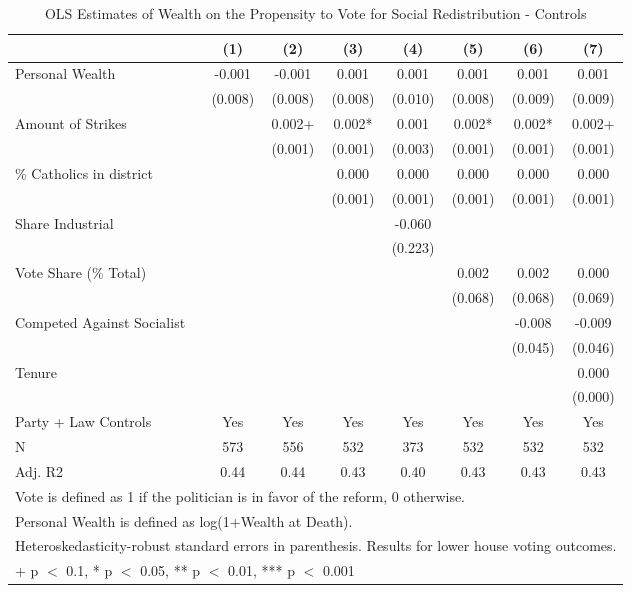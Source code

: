 \begin{table}

\caption{\label{tab:socialred_ols}OLS Estimates of Wealth on the Propensity to Vote for Social Redistribution - Controls}
\centering
\begin{tabular}[t]{lccccccc}
\toprule
  & (1) & (2) & (3) & (4) & (5) & (6) & (7)\\
\midrule
Personal Wealth & -0.001 & -0.001 & 0.001 & 0.001 & 0.001 & 0.001 & 0.001\\
 & (0.008) & (0.008) & (0.008) & (0.010) & (0.008) & (0.009) & (0.009)\\
Amount of Strikes &  & 0.002+ & 0.002* & 0.001 & 0.002* & 0.002* & 0.002+\\
 &  & (0.001) & (0.001) & (0.003) & (0.001) & (0.001) & (0.001)\\
\% Catholics in district &  &  & 0.000 & 0.000 & 0.000 & 0.000 & 0.000\\
 &  &  & (0.001) & (0.001) & (0.001) & (0.001) & (0.001)\\
Share Industrial &  &  &  & -0.060 &  &  & \\
 &  &  &  & (0.223) &  &  & \\
Vote Share (\% Total) &  &  &  &  & 0.002 & 0.002 & 0.000\\
 &  &  &  &  & (0.068) & (0.068) & (0.069)\\
Competed Against Socialist &  &  &  &  &  & -0.008 & -0.009\\
 &  &  &  &  &  & (0.045) & (0.046)\\
Tenure &  &  &  &  &  &  & 0.000\\
 &  &  &  &  &  &  & (0.000)\\
\midrule
Party + Law Controls & Yes & Yes & Yes & Yes & Yes & Yes & Yes\\
N & 573 & 556 & 532 & 373 & 532 & 532 & 532\\
Adj. R2 & 0.44 & 0.44 & 0.43 & 0.40 & 0.43 & 0.43 & 0.43\\
\bottomrule
\multicolumn{8}{l}{\rule{0pt}{1em}Vote is defined as 1 if the politician is in favor of the reform, 0 otherwise.}\\
\multicolumn{8}{l}{\rule{0pt}{1em}Personal Wealth is defined as log(1+Wealth at Death).}\\
\multicolumn{8}{l}{\rule{0pt}{1em}Heteroskedasticity-robust standard errors in parenthesis. Results for lower house voting outcomes.}\\
\multicolumn{8}{l}{\rule{0pt}{1em}+ p $<$ 0.1, * p $<$ 0.05, ** p $<$ 0.01, *** p $<$ 0.001}\\
\end{tabular}
\end{table}
